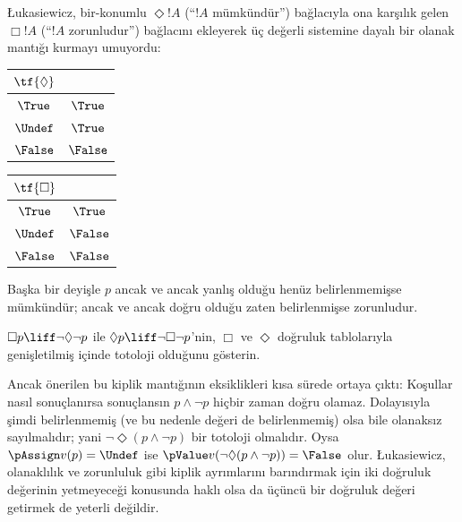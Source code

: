 \L ukasiewicz, bir-konumlu $\Diamond !A$ (“$!A$ mümkündür”) bağlacıyla ona
karşılık gelen $\Box !A$ (“$!A$ zorunludur”) bağlacını ekleyerek üç değerli
sistemine dayalı bir olanak mantığı kurmayı umuyordu:
\begin{center}
  \begin{tabular}{c|c} 
    $\tf{\Diamond}$ & \\ 
    \hline  
    $\True$ & $\True$ \\ 
    $\Undef$ & $\True$ \\
    $\False$ & $\False$ 
  \end{tabular}
  \quad
  \begin{tabular}{c|c} 
    $\tf{\Box}$ & \\ 
    \hline  
    $\True$ & $\True$ \\ 
    $\Undef$ & $\False$ \\
    $\False$ & $\False$ 
  \end{tabular}
\end{center}
Başka bir deyişle $p$ ancak ve ancak yanlış olduğu henüz belirlenmemişse
mümkündür; ancak ve ancak doğru olduğu zaten belirlenmişse zorunludur.

\begin{prob}
  $\Box p \liff \lnot\Diamond \lnot p$ ile $\Diamond p \liff
  \lnot \Box \lnot p$'nin, $\Box$ ve $\Diamond$ doğruluk tablolarıyla
  genişletilmiş \LogLuk[3] içinde totoloji olduğunu gösterin.
\end{prob}

Ancak önerilen bu kiplik mantığının eksiklikleri kısa sürede ortaya çıktı:
Koşullar nasıl sonuçlanırsa sonuçlansın $p \land \lnot p$ hiçbir zaman doğru
olamaz. Dolayısıyla şimdi belirlenmemiş (ve bu nedenle değeri de
belirlenmemiş) olsa bile olanaksız sayılmalıdır; yani
$\lnot \Diamond(p \land \lnot p)$ bir totoloji olmalıdır. Oysa
$\pAssign v(p) = \Undef$ ise
$\pValue v(\lnot \Diamond(p \land \lnot p)) = \False$ olur.
\L ukasiewicz, olanaklılık ve zorunluluk gibi kiplik ayrımlarını barındırmak
için iki doğruluk değerinin yetmeyeceği konusunda haklı olsa da üçüncü bir
doğruluk değeri getirmek de yeterli değildir.


